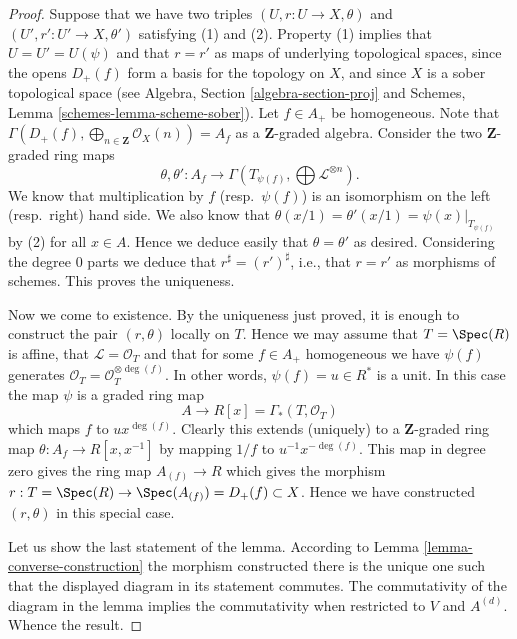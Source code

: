 \begin{proof}
Suppose that we have two triples $(U, r : U \to X, \theta)$
and $(U', r' : U' \to X, \theta')$ satisfying (1) and (2).
Property (1) implies that $U = U' = U(\psi)$ and that
$r = r'$ as maps of underlying topological
spaces, since the opens $D_{+}(f)$ form a basis for the topology
on $X$, and since $X$ is a sober topological space (see
Algebra, Section \ref{algebra-section-proj}
and
Schemes, Lemma \ref{schemes-lemma-scheme-sober}).
Let $f \in A_{+}$ be homogeneous. Note that
$\Gamma(D_{+}(f), \bigoplus_{n \in \mathbf{Z}} \mathcal{O}_X(n)) = A_f$
as a $\mathbf{Z}$-graded algebra. Consider the two
$\mathbf{Z}$-graded ring maps
$$
\theta, \theta' :
A_f
\longrightarrow
\Gamma(T_{\psi(f)}, \bigoplus \mathcal{L}^{\otimes n}).
$$
We know that multiplication by $f$ (resp.\ $\psi(f)$)
is an isomorphism on the left (resp.\ right) hand side.
We also know that $\theta(x/1) = \theta'(x/1) = \psi(x)|_{T_{\psi(f)}}$
by (2) for all $x \in A$. Hence we deduce easily that $\theta = \theta'$
as desired. Considering the degree $0$ parts we deduce that
$r^\sharp = (r')^\sharp$, i.e., that $r = r'$ as morphisms of schemes.
This proves the uniqueness.

\medskip\noindent
Now we come to existence. By the uniqueness just proved, it is enough to
construct the pair $(r, \theta)$ locally on $T$. Hence we may assume
that $T = \Spec(R)$ is affine, that $\mathcal{L} = \mathcal{O}_T$
and that for some $f \in A_{+}$ homogeneous we have
$\psi(f)$ generates $\mathcal{O}_T = \mathcal{O}_T^{\otimes \deg(f)}$.
In other words, $\psi(f) = u \in R^*$ is a unit. In this case the map
$\psi$ is a graded ring map
$$
A \longrightarrow R[x] = \Gamma_*(T, \mathcal{O}_T)
$$
which maps $f$ to $ux^{\deg(f)}$. Clearly this extends (uniquely) to
a $\mathbf{Z}$-graded ring map $\theta : A_f \to R[x, x^{-1}]$ by
mapping $1/f$ to $u^{-1}x^{-\deg(f)}$. This map in degree zero gives
the ring map $A_{(f)} \to R$ which gives the morphism
$r : T = \Spec(R) \to \Spec(A_{(f)}) = D_{+}(f) \subset X$.
Hence we have constructed $(r, \theta)$ in this special case.

\medskip\noindent
Let us show the last statement of the lemma.
According to Lemma \ref{lemma-converse-construction}
the morphism constructed there is the unique one such that
the displayed diagram in its statement commutes.
The commutativity of the diagram in the lemma implies the
commutativity when restricted to $V$ and $A^{(d)}$.
Whence the result.
\end{proof}

